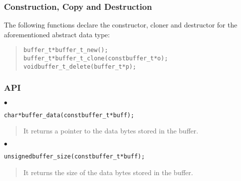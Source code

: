 \documentclass[a4paper]{article}
\newenvironment{code}%
{\begin{quote}\footnotesize\begin{alltt}}%
{\end{alltt}\end{quote}}%
\newenvironment{api}%
{\noindent$\bullet$\hfill\begin{minipage}[t]{0.97\linewidth}\footnotesize\begin{alltt}}%
{\end{alltt}\end{minipage}}%
\begin{document}
\subsubsection*{Construction, Copy and Destruction}
The following functions declare the constructor, cloner and destructor
for the aforementioned abstract data type:
\begin{code}
buffer_t* buffer_t_new();
buffer_t* buffer_t_clone(const buffer_t* o);
void buffer_t_delete(buffer_t* p);
\end{code}
\subsubsection*{API}
\begin{api}
char* buffer_data(const buffer_t* buff);
\end{api}
\begin{quote}\footnotesize
It returns a pointer to the data bytes stored in the buffer.
\end{quote}
\begin{api}
unsigned buffer_size(const buffer_t* buff);
\end{api}
\begin{quote}\footnotesize
It returns the size of the data bytes stored in the buffer.
\end{quote}
\end{document}
